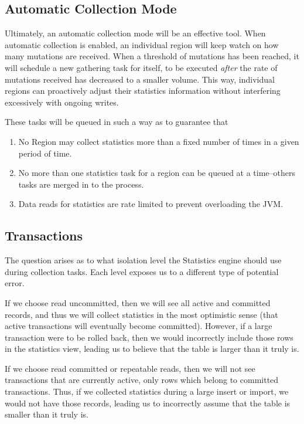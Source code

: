 \subsection{Automatic Collection Mode}
Ultimately, an automatic collection mode will be an effective tool. When automatic collection is enabled, an individual region will keep watch on how many mutations are received. When a threshold of mutations has been reached, it will schedule a new gathering task for itself, to be executed \emph{after} the rate of mutations received has decreased to a smaller volume. This way, individual regions can proactively adjust their statistics information without interfering excessively with ongoing writes. 

These tasks will be queued in such a way as to guarantee that

\begin{enumerate}
				\item No Region may collect statistics more than a fixed number of times in a given period of time.
				\item No more than one statistics task for a region can be queued at a time--others tasks are merged in to the process.
				\item Data reads for statistics are rate limited to prevent overloading the JVM.
\end{enumerate}

\subsection{Transactions}
The question arises as to what isolation level the Statistics engine should use during collection tasks. Each level exposes us to a different type of potential error. 

If we choose read uncommitted, then we will see all active and committed records, and thus we will collect statistics in the most optimistic sense (that active transactions will eventually become committed). However, if a large transaction were to be rolled back, then we would incorrectly include those rows in the statistics view, leading us to believe that the table is larger than it truly is.

If we choose read committed or repeatable reads, then we will not see transactions that are currently active, only rows which belong to committed transactions. Thus, if we collected statistics during a large insert or import, we would not have those records, leading us to incorrectly assume that the table is smaller than it truly is.

